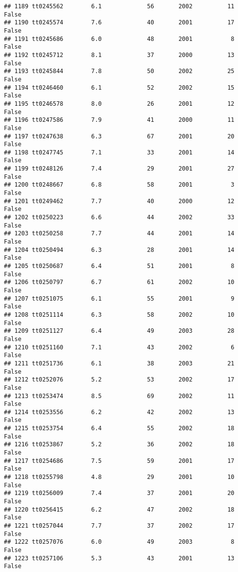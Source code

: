 \documentclass[
]{article}
\begin{document}
\begin{verbatim}
## 1189 tt0245562        6.1             56       2002          11   False
## 1190 tt0245574        7.6             40       2001          17   False
## 1191 tt0245686        6.0             48       2001           8   False
## 1192 tt0245712        8.1             37       2000          13   False
## 1193 tt0245844        7.8             50       2002          25   False
## 1194 tt0246460        6.1             52       2002          15   False
## 1195 tt0246578        8.0             26       2001          12   False
## 1196 tt0247586        7.9             41       2000          11   False
## 1197 tt0247638        6.3             67       2001          20   False
## 1198 tt0247745        7.1             33       2001          14   False
## 1199 tt0248126        7.4             29       2001          27   False
## 1200 tt0248667        6.8             58       2001           3   False
## 1201 tt0249462        7.7             40       2000          12   False
## 1202 tt0250223        6.6             44       2002          33   False
## 1203 tt0250258        7.7             44       2001          14   False
## 1204 tt0250494        6.3             28       2001          14   False
## 1205 tt0250687        6.4             51       2001           8   False
## 1206 tt0250797        6.7             61       2002          10   False
## 1207 tt0251075        6.1             55       2001           9   False
## 1208 tt0251114        6.3             58       2002          10   False
## 1209 tt0251127        6.4             49       2003          28   False
## 1210 tt0251160        7.1             43       2002           6   False
## 1211 tt0251736        6.1             38       2003          21   False
## 1212 tt0252076        5.2             53       2002          17   False
## 1213 tt0253474        8.5             69       2002          11   False
## 1214 tt0253556        6.2             42       2002          13   False
## 1215 tt0253754        6.4             55       2002          18   False
## 1216 tt0253867        5.2             36       2002          18   False
## 1217 tt0254686        7.5             59       2001          17   False
## 1218 tt0255798        4.8             29       2001          10   False
## 1219 tt0256009        7.4             37       2001          20   False
## 1220 tt0256415        6.2             47       2002          18   False
## 1221 tt0257044        7.7             37       2002          17   False
## 1222 tt0257076        6.0             49       2003           8   False
## 1223 tt0257106        5.3             43       2001          13   False

\end{verbatim}
\end{document}
